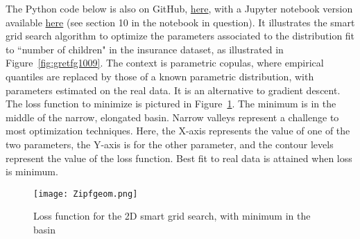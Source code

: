 \documentclass[oneside,10pt]{book}
\begin{document}
The Python code below is also on GitHub, \href{https://github.com/VincentGranville/Statistical-Optimization/blob/main/ZetaGeom.py}{here},
 with a Jupyter notebook version available \href{https://github.com/VincentGranville/Notebooks/blob/main/copula_insurance_nogroup.ipynb}{here} (see section 10 in the notebook in question). It illustrates the smart grid search algorithm to optimize the parameters associated to the
 distribution fit to ``number of children" in the insurance dataset, as illustrated in Figure~\ref{fig:gretfg1009}. The context is parametric copulas,
 where empirical quantiles are replaced by those of a known parametric distribution, with parameters estimated on the real data. It is an alternative to gradient descent. The loss function to minimize is pictured in Figure~\ref{fig:gretddfaq}. The minimum is in the middle of the narrow, elongated basin. Narrow valleys represent a challenge to most optimization techniques. Here, the X-axis represents the value of one of the two parameters, the Y-axis is for the other parameter, and the contour levels represent the value of the loss function. Best fit to real data is attained when loss is minimum.

\begin{figure}[H]
\centering
\texttt{[image: Zipfgeom.png]}   
\caption{Loss function for the 2D smart grid search, with minimum in the basin}
\label{fig:gretddfaq}
\end{figure} 
\end{document}
